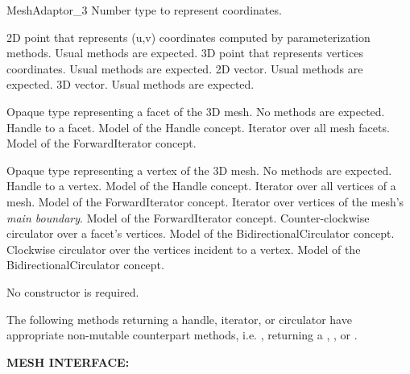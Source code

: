 \begin{ccRefConcept}{MeshAdaptor_3}
       {Number type to represent coordinates.}

       {2D point that represents (u,v) coordinates computed
        by parameterization methods. Usual methods are expected.}
\ccGlue
{}
       {3D point that represents vertices coordinates. Usual methods are expected.}
\ccGlue
{}
       {2D vector. Usual methods are expected.}
\ccGlue
{}
       {3D vector. Usual methods are expected.}

       {Opaque type representing a facet of the 3D mesh.
        No methods are expected.}
\ccGlue
{}
       {Handle to a facet. Model of the Handle concept.}
\ccGlue
{}
       {Iterator over all mesh facets. Model of the ForwardIterator concept.}

       {Opaque type representing a vertex of the 3D mesh.
        No methods are expected.}
\ccGlue
{}
       {Handle to a vertex. Model of the Handle concept.}
\ccGlue
{}
       {Iterator over all vertices of a mesh. Model of the ForwardIterator concept.}
\ccGlue
{}
       {Iterator over vertices of the mesh's \emph{main boundary}.
        Model of the ForwardIterator concept.}
\ccGlue
{}
       {Counter-clockwise circulator over a facet's vertices.
        Model of the BidirectionalCirculator concept.}
\ccGlue
{}
       {Clockwise circulator over the vertices incident to a vertex.
        Model of the BidirectionalCirculator concept.}


\ccCreation


No constructor is required.


\ccOperations

The following methods returning a handle, iterator, or circulator have appropriate
non-mutable counterpart methods, i.e. , returning a ,
, or .

\textbf{MESH INTERFACE:}


\end{ccRefConcept}
